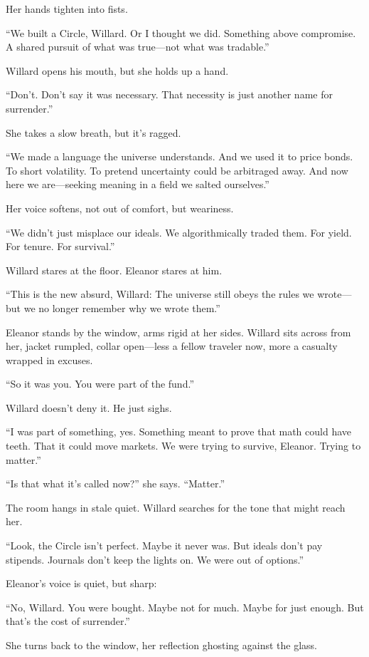 Her hands tighten into fists.

“We built a Circle, Willard. Or I thought we did. Something above compromise. A shared pursuit of what was true—not what was tradable.”

Willard opens his mouth, but she holds up a hand.

“Don’t. Don’t say it was necessary. That necessity is just another name for surrender.”

She takes a slow breath, but it’s ragged.

“We made a language the universe understands. And we used it to price bonds. To short volatility. To pretend uncertainty could be arbitraged away. And now here we are—seeking meaning in a field we salted ourselves.”

Her voice softens, not out of comfort, but weariness.

“We didn’t just misplace our ideals. We algorithmically traded them. For yield. For tenure. For survival.”

Willard stares at the floor. Eleanor stares at him.

“This is the new absurd, Willard:
The universe still obeys the rules we wrote—
but we no longer remember why we wrote them.”



Eleanor stands by the window, arms rigid at her sides. Willard sits across from her, jacket rumpled, collar open—less a fellow traveler now, more a casualty wrapped in excuses.

“So it was you. You were part of the fund.”

Willard doesn’t deny it. He just sighs.

“I was part of something, yes. Something meant to prove that math could have teeth. That it could move markets. We were trying to survive, Eleanor. Trying to matter.”

“Is that what it’s called now?” she says. “Matter.”

The room hangs in stale quiet. Willard searches for the tone that might reach her.

“Look, the Circle isn’t perfect. Maybe it never was. But ideals don’t pay stipends. Journals don’t keep the lights on. We were out of options.”

Eleanor’s voice is quiet, but sharp:

“No, Willard. You were bought. Maybe not for much. Maybe for just enough. But that’s the cost of surrender.”

She turns back to the window, her reflection ghosting against the glass.


